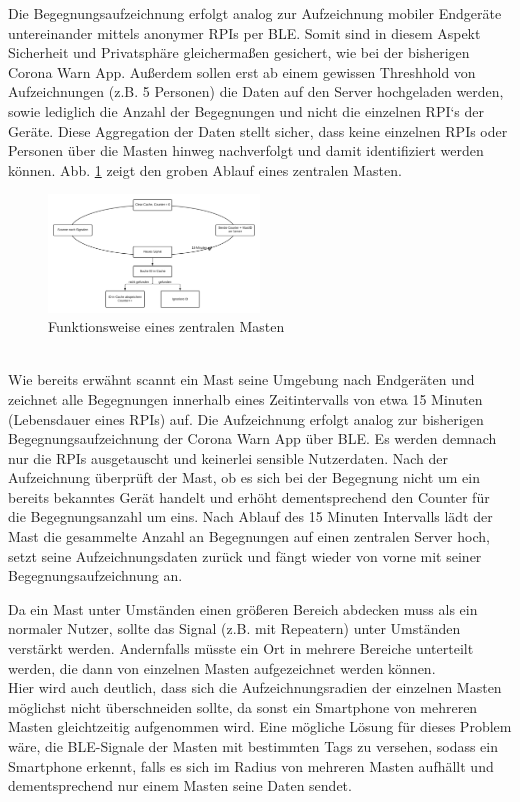 \documentclass[conference,compsoc]{IEEEtran}
\begin{document}
Die Begegnungsaufzeichnung erfolgt analog zur Aufzeichnung mobiler Endgeräte untereinander mittels anonymer RPIs per BLE. 
Somit sind in diesem Aspekt Sicherheit und Privatsphäre gleichermaßen gesichert, wie bei der bisherigen Corona Warn App. 
Außerdem sollen erst ab einem gewissen Threshhold von Aufzeichnungen (z.B. 5 Personen) die Daten auf den Server hochgeladen werden, sowie lediglich die Anzahl der Begegnungen und nicht die einzelnen RPI‘s der Geräte. 
Diese Aggregation der Daten stellt sicher, dass keine einzelnen RPIs oder Personen über die Masten hinweg nachverfolgt und damit identifiziert werden können. 
Abb. \ref{mast_func} zeigt den groben Ablauf eines zentralen Masten. \\ 
\begin{figure}[h]
	\centering
	\includegraphics[width=0.5\textwidth]{"Mast_functionality"}
	\caption{Funktionsweise eines zentralen Masten}
	\label{mast_func}
\end{figure}
\\
Wie bereits erwähnt scannt ein Mast seine Umgebung nach Endgeräten und zeichnet alle Begegnungen innerhalb eines Zeitintervalls von etwa 15 Minuten (Lebensdauer eines RPIs) auf. 
Die Aufzeichnung erfolgt analog zur bisherigen Begegnungsaufzeichnung der Corona Warn App über BLE. 
Es werden demnach nur die RPIs ausgetauscht und keinerlei sensible Nutzerdaten. 
Nach der Aufzeichnung überprüft der Mast, ob es sich bei der Begegnung nicht um ein bereits bekanntes Gerät handelt und erhöht dementsprechend den Counter für die Begegnungsanzahl um eins. 
Nach Ablauf des 15 Minuten Intervalls lädt der Mast die gesammelte Anzahl an Begegnungen auf einen zentralen Server hoch, setzt seine Aufzeichnungsdaten zurück und  fängt wieder von vorne mit seiner Begegnungsaufzeichnung an. 

Da ein Mast unter Umständen einen größeren Bereich abdecken muss als ein normaler Nutzer, sollte das Signal (z.B. mit Repeatern) unter Umständen verstärkt werden.
Andernfalls müsste ein Ort in mehrere Bereiche unterteilt werden, die dann von einzelnen Masten aufgezeichnet werden können. \\
Hier wird auch deutlich, dass sich die Aufzeichnungsradien der einzelnen Masten möglichst nicht überschneiden sollte, da sonst ein Smartphone von mehreren Masten gleichtzeitig aufgenommen wird.
Eine mögliche Lösung für dieses Problem wäre, die BLE-Signale der Masten mit bestimmten Tags zu versehen, sodass ein Smartphone erkennt, falls es sich im Radius von mehreren Masten aufhällt und dementsprechend nur einem Masten seine Daten sendet. 
\end{document}
